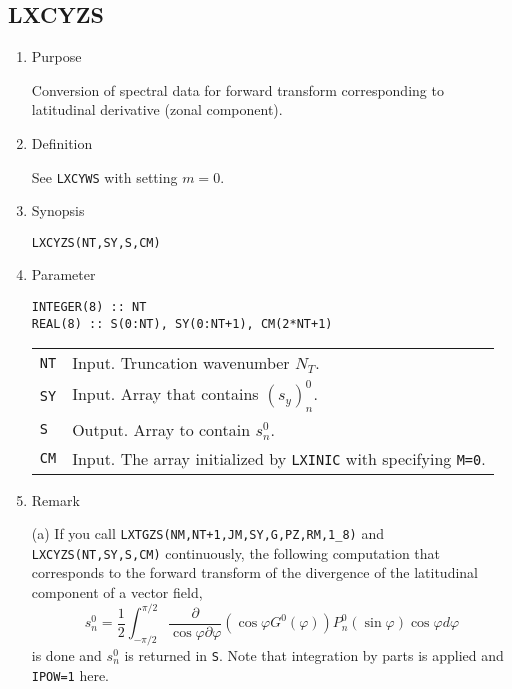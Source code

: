\documentclass[a4paper]{scrartcl}
\begin{document}
\subsection{LXCYZS}

\begin{enumerate}

\item Purpose 

Conversion of spectral data for forward transform
corresponding to latitudinal derivative (zonal component).

\item Definition
  
See \texttt{LXCYWS} with setting $m=0$.

\item Synopsis
    
\texttt{LXCYZS(NT,SY,S,CM)}
  
\item Parameter

\begin{verbatim}
INTEGER(8) :: NT
REAL(8) :: S(0:NT), SY(0:NT+1), CM(2*NT+1)
\end{verbatim}
      
\begin{tabular}{ll}
\texttt{NT} & Input. Truncation wavenumber $N_T$.\\
\texttt{SY} & Input. Array that contains $(s_y)^0_n$.\\
\texttt{S} & Output. Array to contain $s^0_n$.\\
\texttt{CM}  & Input. The array initialized by \texttt{LXINIC}
with specifying \texttt{M=0}.
\end{tabular}

\item Remark

(a) If you call \texttt{LXTGZS(NM,NT+1,JM,SY,G,PZ,RM,1\_8)} and 
    \texttt{LXCYZS(NT,SY,S,CM)} continuously,
    the following computation that corresponds to
    the forward transform of the divergence of the latitudinal
    component of a vector field,  
\begin{equation}
s^0_n=\frac1{2}\int^{\pi/2}_{-\pi/2}
\frac{\partial}{\cos\varphi\partial\varphi}
\left(\cos\varphi G^0(\varphi)\right)
P^0_n(\sin\varphi)\cos\varphi d\varphi
\end{equation}
is done and $s^0_n$ is returned in \texttt{S}.
Note that integration by parts is applied and \texttt{IPOW=1} here.
  
\end{enumerate}
\end{document}
